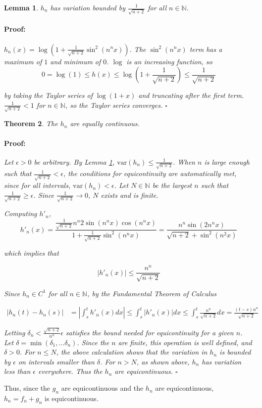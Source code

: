 \documentclass{article}
\newenvironment{proof}{\paragraph{Proof:}}{\hfill$\square$}
\newtheorem{theorem}{Theorem}
\newtheorem{lemma}[theorem]{Lemma}
\newcommand{\N}{\mathbb{N}}
\newcommand{\var}{\text{var}}
\begin{document}
\begin{lemma}
\label{HnBoundedVariation}
$h_n$ has variation bounded by $\frac{1}{\sqrt{n+2}}$ for all $n \in \N$.
\begin{proof}
$h_n(x) = \log(1 + \frac{1}{\sqrt{n+2}} \sin^2(n^n x))$. The $\sin^2(n^n x)$ term has a maximum of $1$ and minimum of $0$. $\log$ is an increasing function, so 
\[
0 = \log(1) \leq h(x) \leq \log(1 + \frac{1}{\sqrt{n+2}}) \leq \frac{1}{\sqrt{n+2}}
\]

by taking the Taylor series of $\log(1+x)$ and truncating after the first term. $\frac{1}{\sqrt{n+2}} < 1$ for $n \in \N$, so the Taylor series converges.
\end{proof}
\end{lemma}

\begin{theorem}
The $h_n$ are equally continuous.
\begin{proof}
Let $\epsilon > 0$ be arbitrary. By Lemma \ref{HnBoundedVariation}, $\var(h_n) \leq \frac{1}{\sqrt{n+2}}$. When $n$ is large enough such that $\frac{1}{\sqrt{n+2}} < \epsilon$, the conditions for equicontinuity are automatically met, since for all intervals, $\var(h_n) < \epsilon$. Let $N \in \N$ be the largest $n$ such that $\frac{1}{\sqrt{n+2}} \geq \epsilon$. Since $\frac{1}{\sqrt{n+2}} \rightarrow 0$, $N$ exists and is finite.

Computing $h'_n$,
\[
h'_n(x) = \frac {
\frac{1}{\sqrt{n+2}} n^n 2 \sin(n^n x) \cos(n^n x)
}{
1 + \frac{1}{\sqrt{n+2}} \sin^2(n^n x)
} 
= 
\frac{
n^n \sin(2n^nx)
}{
\sqrt{n+2} + \sin^2(n^2 x)
}
\]

which implies that

\[
|h'_n(x)| \leq \frac{n^n}{\sqrt{n+2}}
\]

Since $h_n \in C^1$ for all $n \in \N$, by the Fundamental Theorem of Calculus

\begin{align*}
|h_n(t) - h_n(s)| &= |\int_s^t h'_n(x)dx| \leq \int_s^t |h'_n(x)| dx \leq \int_s^t \frac{n^n}{\sqrt{n+2}} dx = \frac{(t-s)n^n}{\sqrt{n+2}}
\end{align*}

Letting $\delta_n < \frac{\sqrt{n+2}}{n^n}\epsilon$ satisfies the bound needed for equicontinuity for a given $n$. Let $\delta = \min(\delta_1, \dots \delta_n)$. Since the $n$ are finite, this operation is well defined, and $\delta > 0$. For $n \leq N$, the above calculation shows that the variation in $h_n$ is bounded by $\epsilon$ on intervals smaller than $\delta$. For $n > N$, as shown above, $h_n$ has variation less than $\epsilon$ everywhere. Thus the $h_n$ are equicontinuous.
\end{proof}
\end{theorem}

Thus, since the $g_n$ are equicontinuous and the $h_n$ are equicontinuous, $h_n = f_n + g_n$ is equicontinuous.
\end{document}
